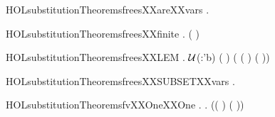 \newcommand{\HOLsubstitutionTheoremsfmlaXXsizeXXinduction}{\UseVerbatim{HOLsubstitutionTheoremsfmlaXXsizeXXinduction}}
\begin{SaveVerbatim}{HOLsubstitutionTheoremsfreesXXareXXvars}
\HOLTokenTurnstile{} \HOLSymConst{\HOLTokenForall{}} .  \HOLConst{\HOLTokenIn{}}   \HOLSymConst{\HOLTokenImp{}}  \HOLConst{\HOLTokenIn{}}  
\end{SaveVerbatim}
\newcommand{\HOLsubstitutionTheoremsfreesXXareXXvars}{\UseVerbatim{HOLsubstitutionTheoremsfreesXXareXXvars}}
\begin{SaveVerbatim}{HOLsubstitutionTheoremsfreesXXfinite}
\HOLTokenTurnstile{} \HOLSymConst{\HOLTokenForall{}}.  ( )
\end{SaveVerbatim}
\newcommand{\HOLsubstitutionTheoremsfreesXXfinite}{\UseVerbatim{HOLsubstitutionTheoremsfreesXXfinite}}
\begin{SaveVerbatim}{HOLsubstitutionTheoremsfreesXXLEM}
\HOLTokenTurnstile{} \HOLSymConst{\HOLTokenForall{}} .
      \ensuremath{\cal{U}}(:'b) \HOLSymConst{\HOLTokenImp{}}
       ( ) \HOLSymConst{\HOLTokenImp{}}
     ( (  ) \HOLSymConst{=}   ( ))
\end{SaveVerbatim}
\newcommand{\HOLsubstitutionTheoremsfreesXXLEM}{\UseVerbatim{HOLsubstitutionTheoremsfreesXXLEM}}
\begin{SaveVerbatim}{HOLsubstitutionTheoremsfreesXXSUBSETXXvars}
\HOLTokenTurnstile{} \HOLSymConst{\HOLTokenForall{}}.   \HOLConst{\HOLTokenSubset{}}  
\end{SaveVerbatim}
\newcommand{\HOLsubstitutionTheoremsfreesXXSUBSETXXvars}{\UseVerbatim{HOLsubstitutionTheoremsfreesXXSUBSETXXvars}}
\begin{SaveVerbatim}{HOLsubstitutionTheoremsfvXXOneXXOne}
\HOLTokenTurnstile{} \HOLSymConst{\HOLTokenForall{}} .
        \HOLSymConst{\HOLTokenImp{}}
     \HOLSymConst{\HOLTokenForall{}} .  \HOLConst{\HOLTokenIn{}}  \HOLSymConst{\HOLTokenConj{}}  \HOLConst{\HOLTokenIn{}}  \HOLSymConst{\HOLTokenImp{}} ((   \HOLSymConst{=}   ) \HOLSymConst{\HOLTokenEquiv{}} ( \HOLSymConst{=} ))
\end{SaveVerbatim}
